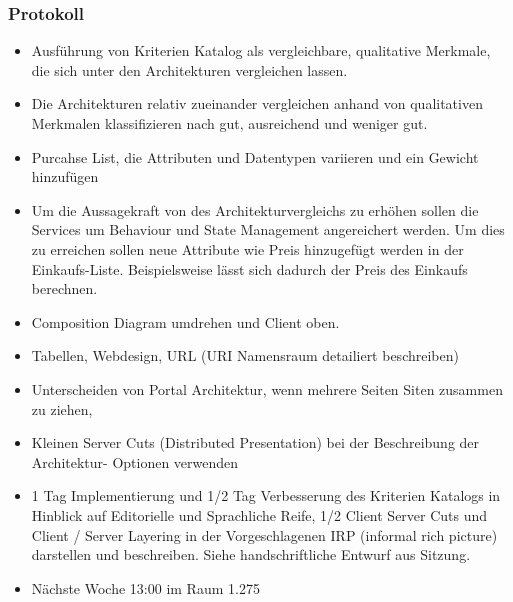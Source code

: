 \documentclass{article}
\begin{document}
\subsubsection{Protokoll}
\begin{itemize}
    \item Ausführung von Kriterien Katalog als vergleichbare, qualitative Merkmale, die sich unter den Architekturen vergleichen lassen.
    \item Die Architekturen relativ zueinander vergleichen anhand von qualitativen Merkmalen klassifizieren nach gut, ausreichend und weniger gut. 
    \item Purcahse List, die Attributen und Datentypen variieren und ein Gewicht hinzufügen
    \item Um die Aussagekraft von des Architekturvergleichs zu erhöhen sollen die Services um Behaviour und State Management angereichert werden. Um dies zu erreichen sollen neue Attribute wie Preis hinzugefügt werden in der Einkaufs-Liste. Beispielsweise lässt sich dadurch der Preis des Einkaufs berechnen.
    \item Composition Diagram umdrehen und Client oben.
    \item Tabellen, Webdesign, URL (URI Namensraum detailiert beschreiben)
    \item Unterscheiden von Portal Architektur, wenn mehrere Seiten Siten zusammen zu ziehen, 
    \item Kleinen Server Cuts (Distributed Presentation) bei der Beschreibung der Architektur- Optionen verwenden
    \item 1 Tag Implementierung und 1/2 Tag Verbesserung des Kriterien Katalogs in Hinblick auf Editorielle und Sprachliche Reife, 1/2 Client Server Cuts und Client / Server Layering in der Vorgeschlagenen IRP (informal rich picture) darstellen und beschreiben. Siehe handschriftliche Entwurf aus Sitzung.
    \item Nächste Woche 13:00 im Raum 1.275
\end{itemize}
\end{document}
